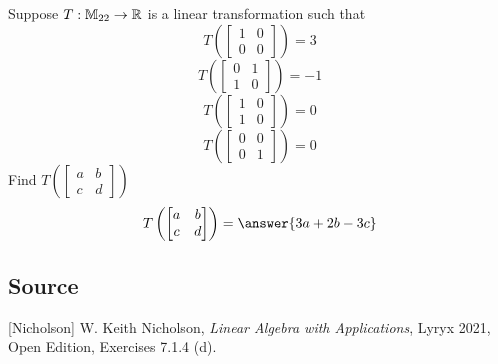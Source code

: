 \documentclass{ximera}
\author{}
\begin{document}
\begin{exercise}
Suppose $T:\mathbb{M}_{22}\rightarrow \mathbb{R}$ is a linear transformation such that $$T\left(\begin{bmatrix}1 & 0\\0 & 0\end{bmatrix}\right)=3$$
$$T\left(\begin{bmatrix}0 & 1\\1 & 0\end{bmatrix}\right)=-1$$
$$T\left(\begin{bmatrix}1 & 0\\1 & 0\end{bmatrix}\right)=0$$
$$T\left(\begin{bmatrix}0 & 0\\0 & 1\end{bmatrix}\right)=0$$
Find $T\left(\begin{bmatrix}a & b\\c & d\end{bmatrix}\right)$
$$T\left(\begin{bmatrix}a & b\\c & d\end{bmatrix}\right)=\answer{3a+2b-3c}$$

 \end{exercise}

\subsection*{Source}
[Nicholson] W. Keith Nicholson, {\it Linear Algebra with Applications}, Lyryx 2021, Open Edition, Exercises 7.1.4 (d).  
\end{document}
